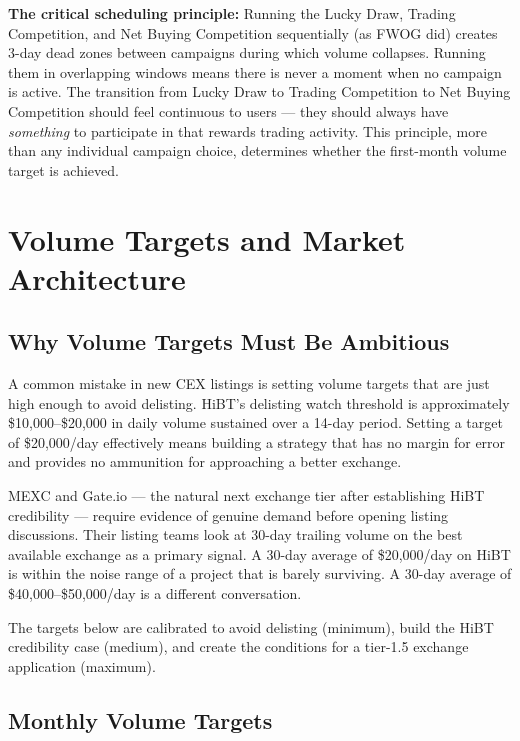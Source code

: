 \documentclass[11pt,a4paper]{article}
\begin{document}
\textbf{The critical scheduling principle:} Running the Lucky Draw, Trading Competition, and Net Buying Competition sequentially (as FWOG did) creates 3-day dead zones between campaigns during which volume collapses. Running them in overlapping windows means there is never a moment when no campaign is active. The transition from Lucky Draw to Trading Competition to Net Buying Competition should feel continuous to users — they should always have \emph{something} to participate in that rewards trading activity. This principle, more than any individual campaign choice, determines whether the first-month volume target is achieved.

\section{Volume Targets and Market Architecture}
\label{sec:volume}

\subsection{Why Volume Targets Must Be Ambitious}

A common mistake in new CEX listings is setting volume targets that are just high enough to avoid delisting. HiBT's delisting watch threshold is approximately \$10,000--\$20,000 in daily volume sustained over a 14-day period. Setting a target of \$20,000/day effectively means building a strategy that has no margin for error and provides no ammunition for approaching a better exchange.

MEXC and Gate.io — the natural next exchange tier after establishing HiBT credibility — require evidence of genuine demand before opening listing discussions. Their listing teams look at 30-day trailing volume on the best available exchange as a primary signal. A 30-day average of \$20,000/day on HiBT is within the noise range of a project that is barely surviving. A 30-day average of \$40,000--\$50,000/day is a different conversation.

The targets below are calibrated to avoid delisting (minimum), build the HiBT credibility case (medium), and create the conditions for a tier-1.5 exchange application (maximum).

\subsection{Monthly Volume Targets}
\end{document}
